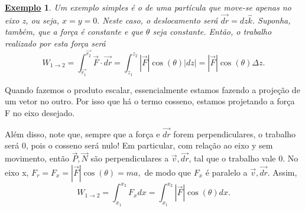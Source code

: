 \documentclass{article}
\newtheorem{example}{\underline{Exemplo}}
\begin{document}
 \begin{example}
   Um exemplo simples é o de uma partícula que move-se apenas no eixo z, ou seja,
   \(x = y = 0.\) Neste caso, o deslocamento será \(\vec{dr} = dz \hat{k}\). Suponha,
   também, que a for\c ca é constante e que \(\theta \) seja constante. Então, o
   trabalho realizado por esta for\c ca será 
     \[
       W_{1\rightarrow2} = \int_{\vec{r_{1}}}^{\vec{r_{2}}}\vec{F}\cdot \vec{dr} = \int_{z_{1}}^{z_{2}}|\vec{F}|\cos{(\theta )}|dz| = |\vec{F}|\cos{(\theta )}\Delta z.
     \]
 \end{example}
 Quando fazemos o produto escalar, essencialmente estamos fazendo a proje\c cão de um
vetor no outro. Por isso que há o termo cosseno, estamos projetando a for\c ca F
no eixo desejado.

  Além disso, note que, sempre que a for\c ca e \(\vec{dr}\) forem perpendiculares,
o trabalho será 0, pois o cosseno será nulo! Em particular, com rela\c cão
ao eixo y sem movimento, então \(\vec{P}, \vec{N}\) são perpendiculares a \(\vec{v}, \vec{dr}\), tal que
o trabalho vale 0. No eixo x, \(F_{r} = F_{x} = |\vec{F}|\cos{(\theta )} = ma,\)
de modo que \(F_{x}\) é paralelo a \(\vec{v}, \vec{dr}\). Assim, 
  \[
    W_{1\rightarrow 2} = \int_{x_{1}}^{x_{2}}F_{x}dx = \int_{x_{1}}^{x_{2}}|\vec{F}|\cos{(\theta )}dx.
  \]
\end{document}
